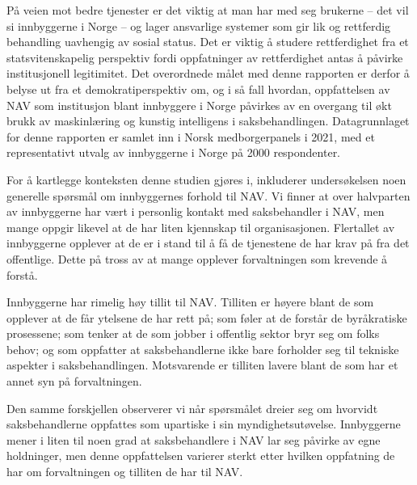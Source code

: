 \documentclass[
]{book}
\begin{document}
På veien mot bedre tjenester er det viktig at man har med seg brukerne -- det vil si innbyggerne i Norge -- og lager ansvarlige systemer som gir lik og rettferdig behandling uavhengig av sosial status.
Det er viktig å studere rettferdighet fra et statsvitenskapelig perspektiv fordi oppfatninger av rettferdighet antas å påvirke institusjonell legitimitet.
Det overordnede målet med denne rapporten er derfor å belyse ut fra et demokratiperspektiv om, og i så fall hvordan, oppfattelsen av NAV som institusjon blant innbyggere i Norge påvirkes av en overgang til økt brukk av maskinlæring og kunstig intelligens i saksbehandlingen.
Datagrunnlaget for denne rapporten er samlet inn i Norsk medborgerpanels i 2021, med et representativt utvalg av innbyggerne i Norge på 2000 respondenter.

For å kartlegge konteksten denne studien gjøres i, inkluderer undersøkelsen noen generelle spørsmål om innbyggernes forhold til NAV.
Vi finner at over halvparten av innbyggerne har vært i personlig kontakt med saksbehandler i NAV, men mange oppgir likevel at de har liten kjennskap til organisasjonen.
Flertallet av innbyggerne opplever at de er i stand til å få de tjenestene de har krav på fra det offentlige.
Dette på tross av at mange opplever forvaltningen som krevende å forstå.

Innbyggerne har rimelig høy tillit til NAV.
Tilliten er høyere blant de som opplever at de får ytelsene de har rett på; som føler at de forstår de byråkratiske prosessene; som tenker at de som jobber i offentlig sektor bryr seg om folks behov; og som oppfatter at saksbehandlerne ikke bare forholder seg til tekniske aspekter i saksbehandlingen.
Motsvarende er tilliten lavere blant de som har et annet syn på forvaltningen.

Den samme forskjellen observerer vi når spørsmålet dreier seg om hvorvidt saksbehandlerne oppfattes som upartiske i sin myndighetsutøvelse.
Innbyggerne mener i liten til noen grad at saksbehandlere i NAV lar seg påvirke av egne holdninger, men denne oppfattelsen varierer sterkt etter hvilken oppfatning de har om forvaltningen og tilliten de har til NAV.
\end{document}
